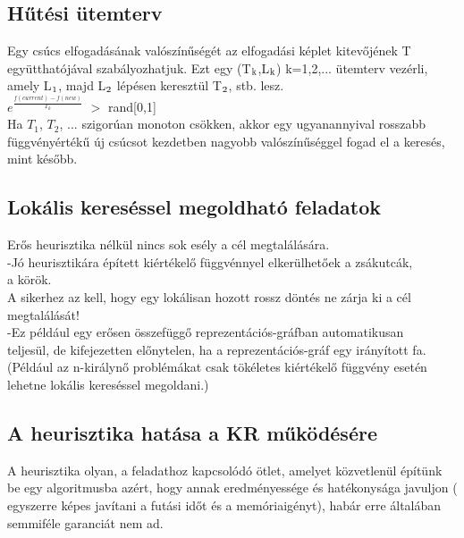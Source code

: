 \documentclass{article}
\begin{document}
	 \subsection{Hűtési ütemterv}
	 Egy csúcs elfogadásának valószínűségét az elfogadási képlet kitevőjének T együtthatójával szabályozhatjuk. Ezt egy (T$\textsubscript{k}$,L$\textsubscript{k}$) k=1,2,... ütemterv vezérli, amely L$\textsubscript{1}$, majd L$\textsubscript{2}$ lépésen keresztül T$\textsubscript{2}$, stb. lesz.\\
	 $e^\frac{f(current)-f(new)}{T_k}$ $>$ rand[0,1]\\
	 Ha $T_1$, $T_2$, ... szigorúan monoton csökken, akkor egy ugyanannyival rosszabb függvényértékű új csúcsot kezdetben nagyobb valószínűséggel fogad el a keresés, mint később.
	 
	 \subsection{Lokális kereséssel megoldható feladatok}
	 Erős heurisztika nélkül nincs sok esély a cél megtalálására.\\
	 \hspace*{0,5em} -Jó heurisztikára épített kiértékelő függvénnyel elkerülhetőek a zsákutcák,\\
	 \hspace*{0,5em} a körök.\\
	 A sikerhez az kell, hogy egy lokálisan hozott rossz döntés ne zárja ki a cél megtalálását!\\
	 \hspace*{0,5em} -Ez például egy erősen összefüggő reprezentációs-gráfban automatikusan \\
	 \hspace*{1em}teljesül, de kifejezetten előnytelen, ha a reprezentációs-gráf egy irányított fa. (Például az n-királynő problémákat csak tökéletes kiértékelő függvény esetén lehetne lokális kereséssel megoldani.)
	 
	 \subsection{A heurisztika hatása a KR működésére}
	 A heurisztika olyan, a feladathoz kapcsolódó ötlet, amelyet közvetlenül építünk be egy algoritmusba azért, hogy annak eredményessége és hatékonysága javuljon ( egyszerre képes javítani a futási időt és a memóriaigényt), habár erre általában semmiféle garanciát nem ad.
	 
	 
	
		
\end{document}
